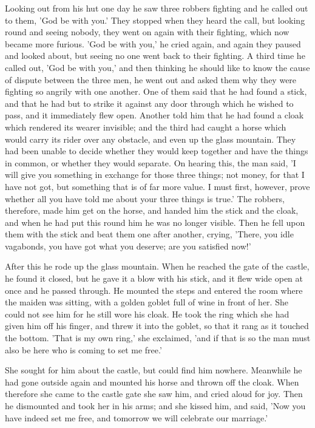 \documentclass[12pt]{book}
\begin{document}
Looking out from his hut one day he saw three robbers fighting and he
called out to them, 'God be with you.' They stopped when they heard
the call, but looking round and seeing nobody, they went on again with
their fighting, which now became more furious. 'God be with you,' he
cried again, and again they paused and looked about, but seeing no one
went back to their fighting. A third time he called out, 'God be with
you,' and then thinking he should like to know the cause of dispute
between the three men, he went out and asked them why they were
fighting so angrily with one another. One of them said that he had
found a stick, and that he had but to strike it against any door
through which he wished to pass, and it immediately flew open. Another
told him that he had found a cloak which rendered its wearer
invisible; and the third had caught a horse which would carry its
rider over any obstacle, and even up the glass mountain. They had been
unable to decide whether they would keep together and have the things
in common, or whether they would separate. On hearing this, the man
said, 'I will give you something in exchange for those three things;
not money, for that I have not got, but something that is of far more
value. I must first, however, prove whether all you have told me about
your three things is true.' The robbers, therefore, made him get on
the horse, and handed him the stick and the cloak, and when he had put
this round him he was no longer visible. Then he fell upon them with
the stick and beat them one after another, crying, 'There, you idle
vagabonds, you have got what you deserve; are you satisfied now!'

After this he rode up the glass mountain. When he reached the gate of
the castle, he found it closed, but he gave it a blow with his stick,
and it flew wide open at once and he passed through. He mounted the
steps and entered the room where the maiden was sitting, with a golden
goblet full of wine in front of her. She could not see him for he
still wore his cloak. He took the ring which she had given him off his
finger, and threw it into the goblet, so that it rang as it touched
the bottom. 'That is my own ring,' she exclaimed, 'and if that is so
the man must also be here who is coming to set me free.'

She sought for him about the castle, but could find him nowhere.
Meanwhile he had gone outside again and mounted his horse and thrown
off the cloak. When therefore she came to the castle gate she saw him,
and cried aloud for joy. Then he dismounted and took her in his arms;
and she kissed him, and said, 'Now you have indeed set me free, and
tomorrow we will celebrate our marriage.'
\end{document}
